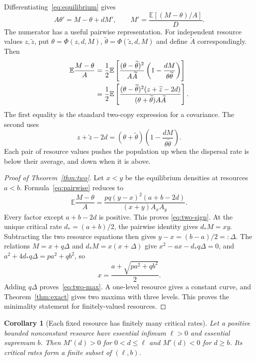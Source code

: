 \documentclass[11pt]{article}
\newtheorem{corollary}[theorem]{Corollary}
\theoremstyle{remark}
\newcommand{\E}{\mathbb E}
\begin{document}
Differentiating~\eqref{eq:equilibrium} gives
\begin{equation}\label{eq:derivative}
 A\theta'=M-\theta+dM',
 \qquad
 M'=\frac{\E[(M-\theta)/A]}{D}.
\end{equation}
The numerator has a useful pairwise representation. For independent
resource values \(z,\widetilde z\), put
\(\theta=\Phi(z,d,M)\), \(\widetilde\theta=\Phi(\widetilde z,d,M)\)
and define \(\widetilde A\) correspondingly. Then
\begin{align}
 \E\frac{M-\theta}{A}
 &=\frac12\E\left[
   \frac{(\theta-\widetilde\theta)^2}{A\widetilde A}
       \left(1-\frac{dM}{\theta\widetilde\theta}\right)\right]\notag\\
 &=\frac12\E\left[
 \frac{(\theta-\widetilde\theta)^2(z+\widetilde z-2d)}
      {(\theta+\widetilde\theta)A\widetilde A}\right].
 \label{eq:pairwise}
\end{align}
The first equality is the standard two-copy expression for a covariance.
The second uses
\[
 z+\widetilde z-2d
  =(\theta+\widetilde\theta)
      \left(1-\frac{dM}{\theta\widetilde\theta}\right).
\]
Each pair of resource values pushes the population up when the dispersal
rate is below their average, and down when it is above.

\begin{proof}[Proof of Theorem~\ref{thm:two}]
Let \(x<y\) be the equilibrium densities at resources \(a<b\).
Formula~\eqref{eq:pairwise} reduces to
\[
 \E\frac{M-\theta}{A}
   =\frac{pq(y-x)^2(a+b-2d)}{(x+y)A_xA_y}.
\]
Every factor except \(a+b-2d\) is positive. This proves
\eqref{eq:two-sign}. At the unique critical rate \(d_*=(a+b)/2\),
the pairwise identity gives \(d_*M=xy\).
Subtracting the two resource equations then gives
\(y-x=(b-a)/2=:\Delta\).
The relations \(M=x+q\Delta\) and \(d_*M=x(x+\Delta)\) give
\(x^2-ax-d_*q\Delta=0\), and \(a^2+4d_*q\Delta=pa^2+qb^2\), so
\[
 x=\frac{a+\sqrt{pa^2+qb^2}}2.
\]
Adding \(q\Delta\) proves~\eqref{eq:two-max}. A one-level resource gives a
constant curve, and Theorem~\ref{thm:exact} gives two maxima with three
levels. This proves the minimality statement for finitely-valued resources.
\end{proof}

\begin{corollary}[Each fixed resource has finitely many critical rates]
\label{cor:finite}
Let a positive bounded nonconstant resource have essential infimum
\(\ell>0\) and essential supremum \(b\). Then \(M'(d)>0\) for
\(0<d\leq\ell\) and \(M'(d)<0\) for \(d\geq b\). Its critical rates form a
finite subset of \((\ell,b)\).
\end{corollary}
\end{document}
